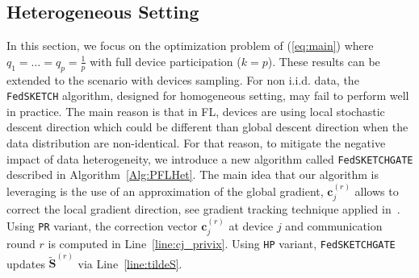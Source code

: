 \documentclass[sigconf, anonymous, review]{acmart}
\begin{document}
\subsection{Heterogeneous Setting}

In this section, we focus on the optimization problem of (\ref{eq:main}) where $q_1=\ldots=q_p=\frac{1}{p}$ with full device participation ($k=p$). 
These results can be extended to the scenario with devices sampling.
For non i.i.d. data, the \texttt{FedSKETCH} algorithm, designed for homogeneous setting, may fail to perform well in practice. 
The main reason is that in FL, devices are using local stochastic descent direction which could be different than global descent direction when the data distribution are non-identical. 
For that reason, to mitigate the negative impact of data heterogeneity, we introduce a new algorithm called \texttt{FedSKETCHGATE} described in Algorithm~\ref{Alg:PFLHet}. 
The main idea that our algorithm is leveraging is the use of an approximation of the global gradient, $\mathbf{c}_j^{(r)}$ allows to correct the local gradient direction, see  gradient tracking technique applied in~\cite{liang2019variance,haddadpour2020federated}. 
Using \texttt{PR} variant, the correction vector $\mathbf{c}_j^{(r)}$ at device $j$ and communication round $r$ is computed in Line~\ref{line:cj_privix}. 
Using \texttt{HP} variant, \texttt{FedSKETCHGATE} updates $\tilde{\mathbf{S}}^{(r)}$ via Line~\ref{line:tildeS}.
\end{document}
